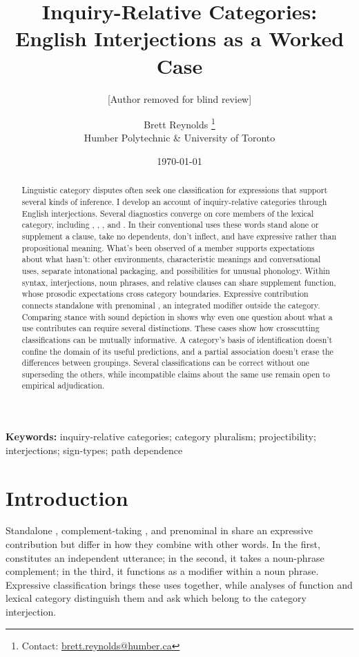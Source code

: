 \documentclass[12pt]{article}
\title{Inquiry-Relative Categories:\\English Interjections as a Worked Case}
\author{[Author removed for blind review]}
\author{Brett Reynolds \orcidlink{0000-0003-0073-7195}%
\thanks{Contact: \href{mailto:brett.reynolds@humber.ca}{brett.reynolds@humber.ca}}\\
Humber Polytechnic \& University of Toronto}
\date{\today}
\begin{document}
\maketitle

\begin{abstract}
Linguistic category disputes often seek one classification for expressions
that support several kinds of inference. I develop an account of
inquiry-relative categories through English interjections. Several
diagnostics converge on core members of the lexical category, including
, , , and . In
their conventional uses these words stand alone or supplement a clause,
take no dependents, don't inflect, and have expressive rather than
propositional meaning. What's been observed of a member supports
expectations about what hasn't: other environments, characteristic meanings and conversational uses,
separate intonational packaging, and possibilities for unusual phonology.
Within syntax, interjections, noun phrases, and relative clauses can share
supplement function, whose prosodic expectations cross category
boundaries. Expressive contribution connects standalone 
with prenominal , an integrated modifier outside the category. Comparing
stance with sound depiction in  shows why even one question
about what a use contributes can require several distinctions.
These cases show how crosscutting classifications can be mutually
informative. A category's basis of identification doesn't confine the
domain of its useful predictions, and a partial association doesn't
erase the differences between groupings. Several classifications can
be correct without one superseding the others, while incompatible
claims about the same use remain open to empirical adjudication.
\end{abstract}

\noindent\textbf{Keywords:} inquiry-relative categories; category pluralism;
projectibility; interjections; sign-types; path dependence


\section{Introduction}\label{sec:intro}

Standalone , complement-taking ,
and prenominal  in  share an expressive
contribution but differ in how they combine with other words. In the first,
 constitutes an independent utterance; in the second, it
takes a noun-phrase complement; in the third, it functions as a modifier
within a noun phrase. Expressive classification brings these uses together,
while analyses of function and lexical category distinguish them and ask
which belong to the category interjection.
\end{document}
